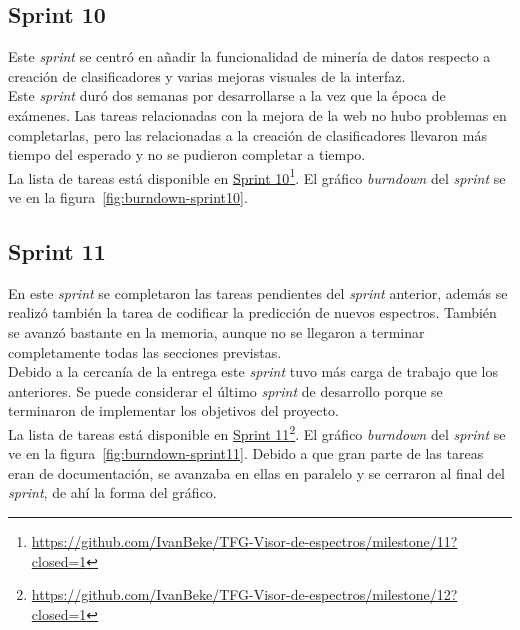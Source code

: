 
\subsection{Sprint 10}
Este \textit{sprint} se centró en añadir la funcionalidad de minería de datos
respecto a creación de clasificadores y varias mejoras visuales de la
interfaz.\\

Este \textit{sprint} duró dos semanas por desarrollarse a la vez que la época de
exámenes. Las tareas relacionadas con la mejora de la web no hubo problemas en
completarlas, pero las relacionadas a la creación de clasificadores llevaron más
tiempo del esperado y no se pudieron completar a tiempo.\\

La lista de tareas está disponible en
\href{https://github.com/IvanBeke/TFG-Visor-de-espectros/milestone/11?closed=1}{Sprint
	10}\footnote{\url{https://github.com/IvanBeke/TFG-Visor-de-espectros/milestone/11?closed=1}}.
El gráfico \textit{burndown} del \textit{sprint} se ve en la
figura~\ref{fig:burndown-sprint10}.\\


\subsection{Sprint 11}
En este \textit{sprint} se completaron las tareas pendientes del \textit{sprint}
anterior, además se realizó también la tarea de codificar la predicción de 
nuevos espectros. También se avanzó bastante en la memoria, aunque no se 
llegaron a terminar completamente todas las secciones previstas.\\

Debido a la cercanía de la entrega este \textit{sprint} tuvo más carga de
trabajo que los anteriores. Se puede considerar el último \textit{sprint} de
desarrollo porque se terminaron de implementar los objetivos del proyecto.\\

La lista de tareas está disponible en
\href{https://github.com/IvanBeke/TFG-Visor-de-espectros/milestone/12?closed=1}{Sprint	
	11}\footnote{\url{https://github.com/IvanBeke/TFG-Visor-de-espectros/milestone/12?closed=1}}.
El gráfico \textit{burndown} del \textit{sprint} se ve en la
figura~\ref{fig:burndown-sprint11}. Debido a que gran parte de las tareas eran
de documentación, se avanzaba en ellas en paralelo y se cerraron al final del
\textit{sprint}, de ahí la forma del gráfico.\\

